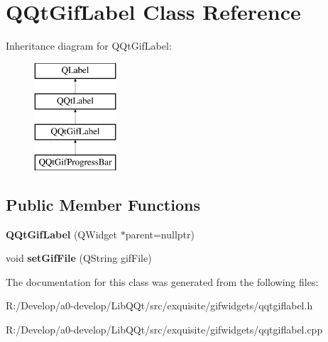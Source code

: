 \hypertarget{class_q_qt_gif_label}{}\section{Q\+Qt\+Gif\+Label Class Reference}
\label{class_q_qt_gif_label}
Inheritance diagram for Q\+Qt\+Gif\+Label\+:\begin{figure}[H]
\begin{center}
\leavevmode
\includegraphics[height=4.000000cm]{class_q_qt_gif_label}
\end{center}
\end{figure}
\subsection*{Public Member Functions}
\begin{DoxyCompactItemize}
\item 
\mbox{\label{class_q_qt_gif_label_a5bac2895f68a2fc8dd08d4450eb75f55}} 
{\bfseries Q\+Qt\+Gif\+Label} (Q\+Widget $\ast$parent=nullptr)
\item 
\mbox{\label{class_q_qt_gif_label_a2d8e0f7002b4399f039df76010c0fe55}} 
void {\bfseries set\+Gif\+File} (Q\+String gif\+File)
\end{DoxyCompactItemize}


The documentation for this class was generated from the following files\+:\begin{DoxyCompactItemize}
\item 
R\+:/\+Develop/a0-\/develop/\+Lib\+Q\+Qt/src/exquisite/gifwidgets/qqtgiflabel.\+h\item 
R\+:/\+Develop/a0-\/develop/\+Lib\+Q\+Qt/src/exquisite/gifwidgets/qqtgiflabel.\+cpp\end{DoxyCompactItemize}
